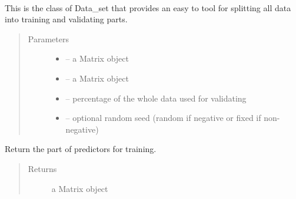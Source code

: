 \documentclass[letterpaper,10pt,english]{sphinxmanual}
\begin{document}
\begin{fulllineitems}
\label{\detokenize{index:dbm_py.interface.Data_set}}~

\begin{fulllineitems}
\label{\detokenize{index:dbm_py.interface.Data_set.__init__}}
This is the class of Data\_set that provides an easy to tool for splitting all data into training and validating
parts.
\begin{quote}\begin{description}
\item[{Parameters}] \leavevmode\begin{itemize}
\item {} 
 -- a Matrix object

\item {} 
 -- a Matrix object

\item {} 
 -- percentage of the whole data used for validating

\item {} 
 -- optional random seed (random if negative or fixed if non-negative)

\end{itemize}

\end{description}\end{quote}

\end{fulllineitems}


\begin{fulllineitems}
\label{\detokenize{index:dbm_py.interface.Data_set.get_train_x}}
Return the part of predictors for training.
\begin{quote}\begin{description}
\item[{Returns}] \leavevmode
a Matrix object


\end{description}
\end{quote}
\end{fulllineitems}
\end{fulllineitems}
\end{document}
